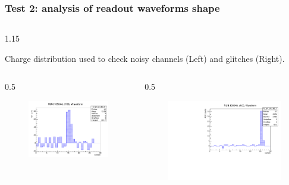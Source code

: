 \documentclass{beamer}
\begin{document}
\begin{frame}
    \frametitle{Test 2: analysis of readout waveforms shape}
            \vspace{-4mm}
        \begin{columns}
    \begin{column}{1.15\framewidth}
        \setlength{\leftmargini}{1.2em}
     \begin{itemize}
    {\small \item Charge distribution used to check noisy channels (Left) and glitches (Right).}
      \end{itemize}
        \end{column}
        \end{columns}
    
         \vspace{-3mm}
        \begin{columns}
    \begin{column}{0.5\framewidth}
             \begin{figure}[!h]
          \centering
          \hspace*{-1em}
        \includegraphics[width=0.95\columnwidth]{figures/pdf/noise.pdf}
         \label{fig:normalhits}
    \end{figure}
    \end{column}
    \begin{column}{0.5\framewidth}
          \begin{figure}[!h]
          \centering
                \hspace*{-1em}
    \includegraphics[width=0.95\columnwidth]{figures/pdf/glitch.pdf}

\end{figure}
\end{column}
\end{columns}
\end{frame}
\end{document}
